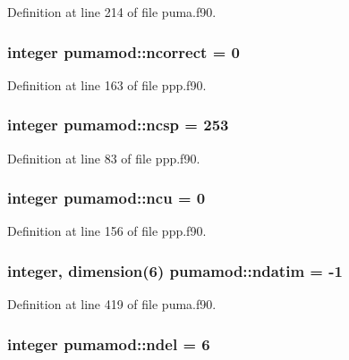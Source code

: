 \-Definition at line 214 of file puma.\-f90.

\hypertarget{classpumamod_a1454296ae1e1d03a284178628a4a3e84}{
\subsubsection[{ncorrect}]{\setlength{\rightskip}{0pt plus 5cm}integer {\bf pumamod\-::ncorrect} = 0}}
\label{classpumamod_a1454296ae1e1d03a284178628a4a3e84}


\-Definition at line 163 of file ppp.\-f90.

\hypertarget{classpumamod_a40c76f46506eb6542ad7ccbed8dd35ba}{
\subsubsection[{ncsp}]{\setlength{\rightskip}{0pt plus 5cm}integer {\bf pumamod\-::ncsp} = 253}}
\label{classpumamod_a40c76f46506eb6542ad7ccbed8dd35ba}


\-Definition at line 83 of file ppp.\-f90.

\hypertarget{classpumamod_a137990cf922778de47c453b0556f611a}{
\subsubsection[{ncu}]{\setlength{\rightskip}{0pt plus 5cm}integer {\bf pumamod\-::ncu} = 0}}
\label{classpumamod_a137990cf922778de47c453b0556f611a}


\-Definition at line 156 of file ppp.\-f90.

\hypertarget{classpumamod_ae562873ebeeb138df379c847e7e01ee4}{
\subsubsection[{ndatim}]{\setlength{\rightskip}{0pt plus 5cm}integer, dimension(6) {\bf pumamod\-::ndatim} = -\/1}}
\label{classpumamod_ae562873ebeeb138df379c847e7e01ee4}


\-Definition at line 419 of file puma.\-f90.

\hypertarget{classpumamod_a9eabecdccc9c5124168c5d89bc15a1d5}{
\subsubsection[{ndel}]{\setlength{\rightskip}{0pt plus 5cm}integer {\bf pumamod\-::ndel} = 6}}
\label{classpumamod_a9eabecdccc9c5124168c5d89bc15a1d5}


